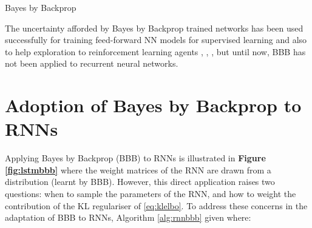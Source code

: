 \begin{algorithm}[ht]
	\caption{Bayes by Backprop}
	\label{alg:bbb}
	\begin{algorithmic}
	\end{algorithmic}
\end{algorithm}

The uncertainty afforded by Bayes by Backprop trained networks has been used successfully for training feed-forward NN models for supervised learning and also to help exploration to reinforcement learning agents \cite{Blundell2015a}, \cite{Lipton2016}, \cite{Houthooft2016}, but until now, BBB has not been applied to recurrent neural networks.

\section{Adoption of Bayes by Backprop to RNNs}
\label{sec:tbbbtt}

Applying Bayes by Backprop (BBB) to RNNs is illustrated in \textbf{Figure \ref{fig:lstmbbb}} where the weight matrices of the RNN are drawn from a distribution (learnt by BBB).
However, this direct application raises two questions: when to sample the parameters of the RNN, and how to weight the contribution of the KL regulariser of \eqref{eq:klelbo}.
To address these concerns in the adaptation of BBB to RNNs, Algorithm \ref{alg:rnnbbb} given where:

